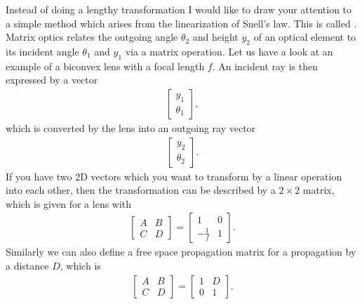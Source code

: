 \documentclass[letterpaper,10pt,english]{sphinxmanual}
\begin{document}
Instead of doing a lengthy transformation I would like to draw your attention to a simple method which arises from the linearization of Snell’s law. This is called . Matrix optics relates the outgoing angle \(\theta_2\) and height \(y_2\) of an optical element to its incident angle \(\theta_1\) and \(y_1\) via a matrix operation. Let us have a look at an example of a biconvex lens with a focal length \(f\). An incident ray is then expressed by a vector
\begin{equation*}
\begin{split}\begin{bmatrix}
y_1\\
\theta_1
\end{bmatrix},\end{split}
\end{equation*}
which is converted by the lens into an outgoing ray vector
\begin{equation*}
\begin{split}\begin{bmatrix}
y_2\\
\theta_2
\end{bmatrix}.\end{split}
\end{equation*}
If you have two 2D vectors which you want to transform by a linear operation into each other, then the transformation can be described by a \(2 \times 2\) matrix, which is given for a lens with
\begin{equation*}
\begin{split}\begin{bmatrix}
A & B\\
C & D
\end{bmatrix}
=
\begin{bmatrix}
1 & 0\\
-\frac{1}{f} & 1
\end{bmatrix}.\end{split}
\end{equation*}
Similarly we can also define a free space propagation matrix for a propagation by a distance \(D\), which is
\begin{equation*}
\begin{split}\begin{bmatrix}
A & B\\
C & D
\end{bmatrix}
=
\begin{bmatrix}
1 & D\\
0 & 1
\end{bmatrix}.\end{split}
\end{equation*}
\end{document}

